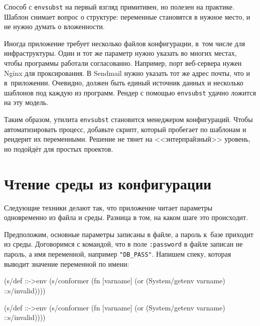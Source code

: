 \fi

Способ с \verb|envsubst| на первый взгляд примитивен, но полезен на
практике. Шаблон снимает вопрос о структуре: переменные становятся в нужное
место, и не нужно думать о вложенности.

Иногда приложение требует несколько файлов конфигурации, в~том числе для
инфраструктуры. Один и тот же параметр нужно указать во многих местах, чтобы
программы работали согласованно. Например, порт веб-сервера нужен Nginx для
проксирования. В Sendmail нужно указать тот же адрес почты, что и
в~приложении. Очевидно, должен быть единый источник данных и несколько шаблонов
под каждую из программ. Рендер с помощью \verb|envsubst| удачно ложится на эту
модель.

Таким образом, утилита \verb|envsubst| становится менеджером конфигураций. Чтобы
автоматизировать процесс, добавьте скрипт, который пробегает по шаблонам и
рендерит их переменными. Решение не тянет на <<энтерпрайзный>> уровень, но
подойдёт для простых проектов.

\section{Чтение среды из конфигурации}

Следующие техники делают так, что приложение читает параметры одновременно из
файла и среды. Разница в том, на каком шаге это происходит.

Предположим, основные параметры записаны в файле, а пароль к~базе приходит из
среды. Договоримся с командой, что в поле \verb|:password| в файле записан не
пароль, а имя переменной, например \verb|"DB_PASS"|. Напишем спеку, которая
выводит значение переменной по имени:

\ifnarrow

\begin{english}
  \begin{clojure}
(s/def ::->env
  (s/conformer
   (fn [varname]
     (or (System/getenv varname)
         ::s/invalid))))
  \end{clojure}
\end{english}

\else

\begin{english}
  \begin{clojure}
(s/def ::->env
  (s/conformer
   (fn [varname]
     (or (System/getenv varname) ::s/invalid))))
  \end{clojure}
\end{english}


